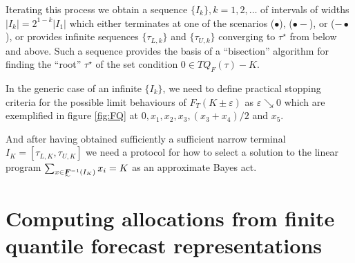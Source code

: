 \documentclass{article}\usepackage[]{graphicx}\usepackage[]{xcolor}
\begin{document}
Iterating this process we obtain a sequence $\{I_k\}, k=1,2,\ldots$ of intervals of widths 
$\left|I_k \right| = 2^{1-k}\left|I_1 \right|$ which either terminates at one of the scenarios 
($\bullet$), ($\bullet\!-$), or ($-\!\bullet$), or provides infinite sequences $\{\tau_{L,k}\}$ and $\{\tau_{U,k}\}$ converging
to $\tau^{\star}$ from below and above. Such a sequence provides the basis of a ``bisection'' algorithm for finding
the ``root'' $\tau^{\star}$ of the set condition $0 \in TQ_F(\tau) - K$.

In the generic case of an infinite $\{I_k\}$, we need to define practical stopping criteria for the possible limit behaviours of 
$F_T(K \pm \varepsilon)$ as $\varepsilon \searrow 0$ which are exemplified in figure \ref{fig:FQ} at $0, x_1, x_2, x_3, (x_3 +x_4)/2$ and 
$x_5$.

And after having obtained sufficiently a sufficient narrow terminal $I_K = [\tau_{L,K}, \tau_{U,K}]$ we need a protocol for 
how to select a solution to the linear program $\sum_{x \in \undertilde{\bm{F}}^{-1}(I_K)}x_i = K$ as an approximate Bayes act.

\section{Computing allocations from finite quantile forecast representations}
\end{document}

